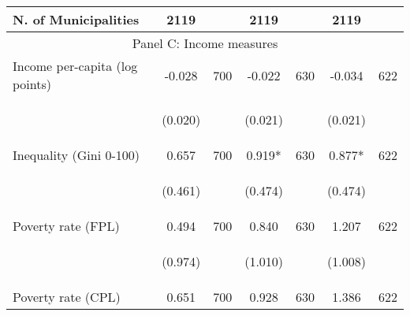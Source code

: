 \begin{tabular}{lcccccc}
N. of Municipalities  &   2119   &  &  2119    & &  2119  &    \\

\hline		

\multicolumn{7}{c}{Panel C: Income measures} \\

Income per-capita (log points)    &  -0.028   &  700  &   -0.022  &  630 &  -0.034  &  622   \\

\vspace{4pt} &  \begin{footnotesize}(0.020)\end{footnotesize}   & &
			    \begin{footnotesize}(0.021)\end{footnotesize}   & &
			    \begin{footnotesize}(0.021)\end{footnotesize}   &
			     \\          


Inequality (Gini 0-100)     &  0.657   &  700  &   0.919*  &  630 &  0.877*  &  622   \\

\vspace{4pt} &  \begin{footnotesize}(0.461)\end{footnotesize}   & &
			    \begin{footnotesize}(0.474)\end{footnotesize}   & &
			    \begin{footnotesize}(0.474)\end{footnotesize}   &
			     \\


Poverty rate (FPL)     &  0.494   &  700  &   0.840  &  630 &  1.207  &  622   \\

\vspace{4pt} &  \begin{footnotesize}(0.974)\end{footnotesize}   & &
			    \begin{footnotesize}(1.010)\end{footnotesize}   & &
			    \begin{footnotesize}(1.008)\end{footnotesize}   &
			     \\
 
Poverty rate (CPL)    &  0.651   &  700  &   0.928  &  630 &  1.386  &  622   \\


\end{tabular}
